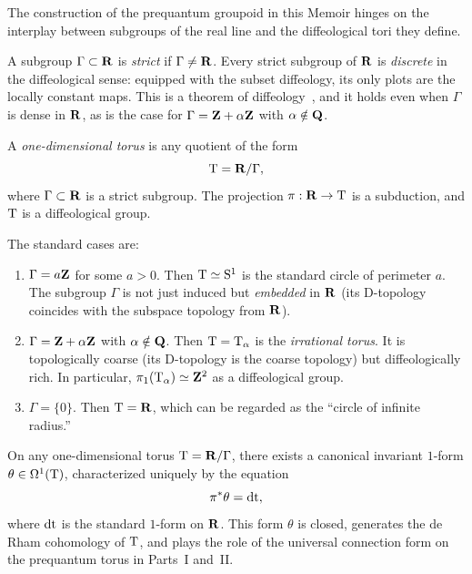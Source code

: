 \documentclass[10pt,reqno,letterpaper,twoside]{amsbook}
\begin{document}
  \begin{article}
    \label{art:One-Dimensional Tori}
    The construction of the prequantum groupoid in this Memoir hinges on the
    interplay between subgroups of the real line and the diffeological tori
    they define.
    
    A subgroup $\Gamma \subset {\mathbf{R}}$ is \emph{strict} if $\Gamma \neq {\mathbf{R}}$.
    Every strict subgroup of ${\mathbf{R}}$ is \emph{discrete} in the diffeological sense:
    equipped with the subset diffeology,
    its only plots are the locally constant maps.
    This is a theorem of diffeology~\cite{PIZ13},
    and it holds even when $\Gamma$ is dense in ${\mathbf{R}}$,
    as is the case for $\Gamma = {\mathbf{Z}} + \alpha{\mathbf{Z}}$ with $\alpha \notin {\mathbf{Q}}$.
    
    \begin{definition}
      A \emph{one-dimensional torus} is any quotient of the form
      \[
        \mathrm{T} = {\mathbf{R}}/\Gamma,
        \]
      where $\Gamma \subset {\mathbf{R}}$ is a strict subgroup.
      The projection $\pi: {\mathbf{R}} \to \mathrm{T}$ is a subduction,
      and $\mathrm{T}$ is a diffeological group.
    \end{definition}
    
    The standard cases are:
    \begin{enumerate}
      \item $\Gamma = a{\mathbf{Z}}$ for some $a > 0$.
      Then $\mathrm{T} \simeq \mathrm{S}^1$ is the standard circle of perimeter $a$.
      The subgroup $\Gamma$ is not just induced but \emph{embedded} in ${\mathbf{R}}$
      (its D-topology coincides with the subspace topology from ${\mathbf{R}}$).
      \item $\Gamma = {\mathbf{Z}} + \alpha{\mathbf{Z}}$ with $\alpha \notin {\mathbf{Q}}$.
      Then $\mathrm{T} = \mathrm{T}_\alpha$ is the \emph{irrational torus}.
      It is topologically coarse (its D-topology is the coarse topology)
      but diffeologically rich.
      In particular,
      $\pi_1(\mathrm{T}_\alpha) \simeq {\mathbf{Z}}^2$ as a diffeological group.
      \item $\Gamma = \{0\}$.
      Then $\mathrm{T} = {\mathbf{R}}$,
      which can be regarded as the ``circle of infinite radius.''
    \end{enumerate}
    
    On any one-dimensional torus $\mathrm{T} = {\mathbf{R}}/\Gamma$,
    there exists a canonical invariant $1$-form $\theta \in \Omega^1(\mathrm{T})$,
    characterized uniquely by the equation
    \[
      \pi^*\theta = \mathrm{dt},
      \]
    where $\mathrm{dt}$ is the standard $1$-form on ${\mathbf{R}}$.
    This form $\theta$ is closed,
    generates the de Rham cohomology of $\mathrm{T}$,
    and plays the role of the universal connection form
    on the prequantum torus in Parts~I and~II.
  \end{article}
  
\end{document}
